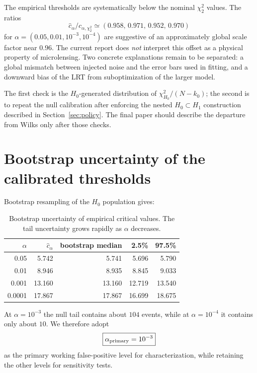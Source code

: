 \documentclass[11pt,a4paper]{article}
\newcommand{\Hnull}{H_0}
\newcommand{\Halt}{H_1}
\begin{document}
The empirical thresholds are systematically below the nominal $\chi^2_2$ values.  The ratios
\begin{equation}
  \widehat c_\alpha/c_{\alpha,\chi^2_2}
  \simeq
  (0.958,\,0.971,\,0.952,\,0.970)
\end{equation}
for $\alpha=(0.05,0.01,10^{-3},10^{-4})$ are suggestive of an approximately global scale
factor near $0.96$.  The current report does \emph{not} interpret this offset as a physical
property of microlensing.  Two concrete explanations remain to be separated: a global mismatch
between injected noise and the error bars used in fitting, and a downward bias of the LRT from
suboptimization of the larger model.

The first check is the $\Hnull$-generated distribution of
$\chi^2_{\Hnull}/(N-k_0)$; the second is to repeat the null calibration after enforcing the
nested $\Hnull\subset\Halt$ construction described in Section~\ref{sec:policy}.  The final paper
should describe the departure from Wilks only after those checks.
\section{Bootstrap uncertainty of the calibrated thresholds}

Bootstrap resampling of the $\Hnull$ population gives:
\begin{table}[H]
\centering
\begin{tabular}{rrrrr}
\toprule
$\alpha$ & $\widehat c_\alpha$ & bootstrap median & 2.5\% & 97.5\%\\
\midrule
0.05   & 5.742 & 5.741 & 5.696 & 5.790\\
0.01   & 8.946 & 8.935 & 8.845 & 9.033\\
0.001  & 13.160 & 13.160 & 12.719 & 13.540\\
0.0001 & 17.867 & 17.867 & 16.699 & 18.675\\
\bottomrule
\end{tabular}
\caption{Bootstrap uncertainty of empirical critical values. The tail uncertainty grows
rapidly as $\alpha$ decreases.}
\end{table}

At $\alpha=10^{-3}$ the null tail contains about $104$ events, while at
$\alpha=10^{-4}$ it contains only about $10$. We therefore adopt
\begin{equation}
    \boxed{\alpha_{\rm primary}=10^{-3}}
\end{equation}
as the primary working false-positive level for characterization, while retaining the other
levels for sensitivity tests.
\end{document}
